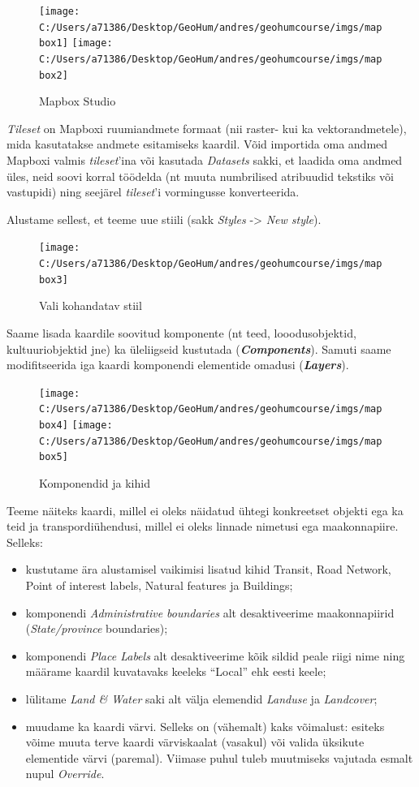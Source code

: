 \documentclass[
]{book}
\providecommand{\tightlist}{%
  \setlength{\itemsep}{0pt}\setlength{\parskip}{0pt}}
\begin{document}
\begin{figure}
\texttt{[image: C:/Users/a71386/Desktop/GeoHum/andres/geohumcourse/imgs/mapbox1]} \texttt{[image: C:/Users/a71386/Desktop/GeoHum/andres/geohumcourse/imgs/mapbox2]} \caption{Mapbox Studio}\label{fig:mapbox1}
\end{figure}

\emph{Tileset} on Mapboxi ruumiandmete formaat (nii raster- kui ka vektorandmetele), mida kasutatakse andmete esitamiseks kaardil. Võid importida oma andmed Mapboxi valmis \emph{tileset}'ina või kasutada \emph{Datasets} sakki, et laadida oma andmed üles, neid soovi korral töödelda (nt muuta numbrilised atribuudid tekstiks või vastupidi) ning seejärel \emph{tileset}'i vormingusse konverteerida.

Alustame sellest, et teeme uue stiili (sakk \emph{Styles} -\textgreater{} \emph{New style}).

\begin{figure}
\texttt{[image: C:/Users/a71386/Desktop/GeoHum/andres/geohumcourse/imgs/mapbox3]} \caption{Vali kohandatav stiil}\label{fig:mapbox2}
\end{figure}

Saame lisada kaardile soovitud komponente (nt teed, looodusobjektid, kultuuriobjektid jne) ka üleliigseid kustutada (\textbf{\emph{Components}}). Samuti saame modifitseerida iga kaardi komponendi elementide omadusi (\textbf{\emph{Layers}}).

\begin{figure}
\texttt{[image: C:/Users/a71386/Desktop/GeoHum/andres/geohumcourse/imgs/mapbox4]} \texttt{[image: C:/Users/a71386/Desktop/GeoHum/andres/geohumcourse/imgs/mapbox5]} \caption{Komponendid ja kihid}\label{fig:mapbox3}
\end{figure}

Teeme näiteks kaardi, millel ei oleks näidatud ühtegi konkreetset objekti ega ka teid ja transpordiühendusi, millel ei oleks linnade nimetusi ega maakonnapiire. Selleks:

\begin{itemize}
\tightlist
\item
  kustutame ära alustamisel vaikimisi lisatud kihid Transit, Road Network, Point of interest labels, Natural features ja Buildings;
\item
  komponendi \emph{Administrative boundaries} alt desaktiveerime maakonnapiirid (\emph{State/province} boundaries);\\
\item
  komponendi \emph{Place Labels} alt desaktiveerime kõik sildid peale riigi nime ning määrame kaardil kuvatavaks keeleks ``Local'' ehk eesti keele;\\
\item
  lülitame \emph{Land \& Water} saki alt välja elemendid \emph{Landuse} ja \emph{Landcover};
\item
  muudame ka kaardi värvi. Selleks on (vähemalt) kaks võimalust: esiteks võime muuta terve kaardi värviskaalat (vasakul) või valida üksikute elementide värvi (paremal). Viimase puhul tuleb muutmiseks vajutada esmalt nupul \emph{Override}.
\end{itemize}
\end{document}
